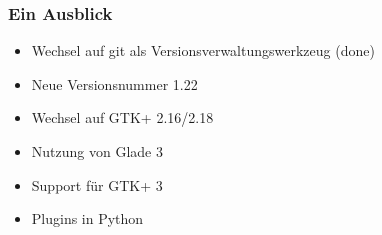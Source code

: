 \begin{frame}
	\frametitle{Ein Ausblick}
	\begin{block}{}
		\begin{itemize}
			\item Wechsel auf git als Versionsverwaltungswerkzeug (done)
			\item Neue Versionsnummer 1.22
			\item Wechsel auf GTK+ 2.16/2.18
			\item Nutzung von Glade 3
			\item Support für GTK+ 3
			\item Plugins in Python
		\end{itemize}
	\end{block}
\end{frame}
